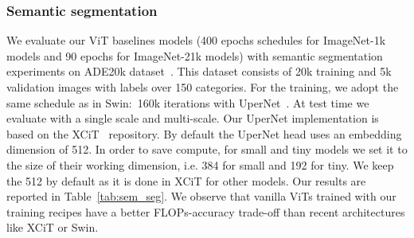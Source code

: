 \subsubsection{Semantic segmentation}
We evaluate our ViT baselines models (400 epochs schedules for ImageNet-1k models and 90 epochs for ImageNet-21k models) with semantic segmentation experiments on  ADE20k dataset~\cite{Zhou2017ScenePT}.
This dataset consists of 20k training and 5k validation images with labels over 150 categories. 
For the training, we adopt the same schedule as in Swin:~160k iterations with UperNet~\cite{xiao2018unified}. 
At test time we evaluate with a single scale and multi-scale.
Our UperNet implementation is based on the XCiT~\cite{el2021xcit} repository.
By default the UperNet head uses an embedding dimension of 512. In order to save compute, for  small and tiny models we set it to the size of their working dimension, i.e. 384 for small and 192 for tiny. We keep the 512 by default as it is done in XCiT for other models.
Our results are reported in Table~\ref{tab:sem_seg}.
We observe that vanilla ViTs trained with our training recipes have a better FLOPs-accuracy trade-off than recent architectures like XCiT or Swin.
